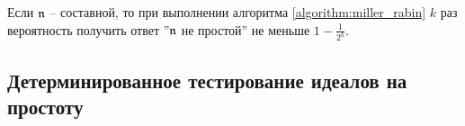 \documentclass[_00_dissertation.tex]{subfiles}
\begin{document}
\begin{remark}
    Если $\mathfrak{n}$ -- составной, то при выполнении алгоритма \ref{algorithm:miller_rabin} $k$ раз вероятность получить ответ ''$\mathfrak{n}$ не простой'' не меньше $1 - \frac{1}{2^k}$.
\end{remark}

\subsection{Детерминированное тестирование идеалов на простоту}

% 
% 
    
    
\end{document}
